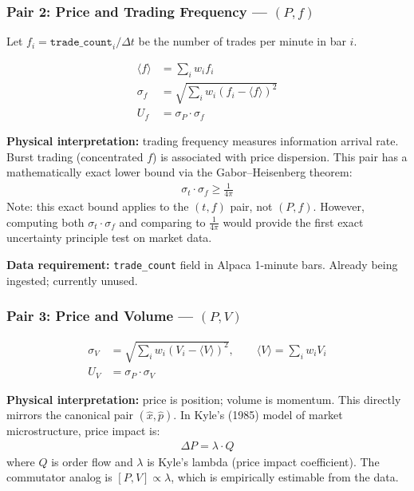 \documentclass[11pt]{article}
\begin{document}
\subsubsection{Pair 2: Price and Trading Frequency --- $(P, f)$}

Let $f_i = \texttt{trade\_count}_i / \Delta t$ be the number of trades per minute in bar $i$.

\begin{align}
    \langle f \rangle &= \sum_i w_i f_i \\
    \sigma_f &= \sqrt{\sum_i w_i (f_i - \langle f \rangle)^2} \\
    U_f &= \sigma_P \cdot \sigma_f
\end{align}

\textbf{Physical interpretation:} trading frequency measures information arrival rate. Burst trading (concentrated $f$) is associated with price dispersion. This pair has a mathematically exact lower bound via the Gabor--Heisenberg theorem:
\begin{align}
    \sigma_t \cdot \sigma_f \geq \frac{1}{4\pi}
\end{align}
Note: this exact bound applies to the $(t, f)$ pair, not $(P, f)$. However, computing both $\sigma_t \cdot \sigma_f$ and comparing to $\frac{1}{4\pi}$ would provide the first exact uncertainty principle test on market data.

\textbf{Data requirement:} \texttt{trade\_count} field in Alpaca 1-minute bars. Already being ingested; currently unused.

\subsubsection{Pair 3: Price and Volume --- $(P, V)$}

\begin{align}
    \sigma_V &= \sqrt{\sum_i w_i (V_i - \langle V \rangle)^2}, \qquad \langle V \rangle = \sum_i w_i V_i \\
    U_V &= \sigma_P \cdot \sigma_V
\end{align}

\textbf{Physical interpretation:} price is position; volume is momentum. This directly mirrors the canonical pair $(\hat{x}, \hat{p})$. In Kyle's (1985) model of market microstructure, price impact is:
\begin{align}
    \Delta P = \lambda \cdot Q
\end{align}
where $Q$ is order flow and $\lambda$ is Kyle's lambda (price impact coefficient). The commutator analog is $[P, V] \propto \lambda$, which is empirically estimable from the data.
\end{document}
